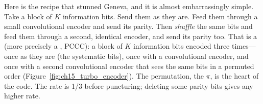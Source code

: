 Here is the recipe that stunned Geneva, and it is almost embarrassingly simple. Take a block of
$K$ information bits. Send them as they are. Feed them through a small convolutional encoder and
send its parity. Then \emph{shuffle} the same bits and feed them through a second, identical
encoder, and send its parity too. That is a  (more precisely a , PCCC): a block of $K$ information bits encoded three times---once
as they are (the systematic bits), once with a convolutional encoder, and once with a second
convolutional encoder that sees the same bits in a permuted order
(Figure~\ref{fig:ch15_turbo_encoder}). The permutation, the  $\pi$, is the heart
of the code. The rate is 1/3 before puncturing; deleting some parity bits gives any higher rate.

